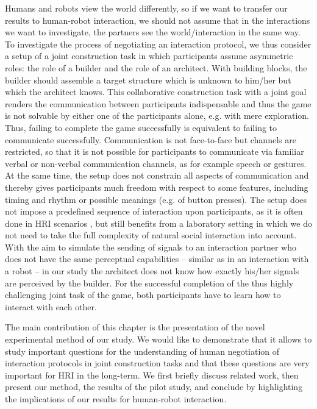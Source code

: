 Humans and robots view the world differently, so if we want to transfer our results to human-robot interaction, we should not assume that in the interactions we want to investigate, the partners see the world/interaction in the same way. To investigate the process of negotiating an interaction protocol, we thus consider a setup of a joint construction task in which participants assume asymmetric roles: the role of a builder and the role of an architect. With building blocks, the builder should assemble a target structure which is unknown to him/her but which the architect knows. This collaborative construction task with a joint goal renders the communication between participants indispensable and thus the game is not solvable by either one of the participants alone, e.g. with mere exploration. Thus, failing to complete the game successfully is equivalent to failing to communicate successfully. Communication is not face-to-face but channels are restricted, so that it is not possible for participants to communicate via familiar verbal or non-verbal communication channels, as for example speech or gestures. At the same time, the setup does not constrain all aspects of communication and thereby gives participants much freedom with respect to some features, including timing and rhythm or possible meanings (e.g. of button presses). The setup does not impose a predefined sequence of interaction upon participants, as it is often done in HRI scenarios \cite{akgun12hri}, but still benefits from a laboratory setting in which we do not need to take the full complexity of natural social interaction into account. With the aim to simulate the sending of signals to an interaction partner who does not have the same perceptual capabilities -- similar as in an interaction with a robot -- in our study the architect does not know how exactly his/her signals are perceived by the builder. For the successful completion of the thus highly challenging joint task of the game, both participants have to learn how to interact with each other.

The main contribution of this chapter is the presentation of the novel experimental method of our study. We would like to demonstrate that it allows to study important questions for the understanding of human negotiation of interaction protocols in joint construction tasks and that these questions are very important for HRI in the long-term. We first briefly discuss related work, then present our method, the results of the pilot study, and conclude by highlighting the implications of our results for human-robot interaction.

